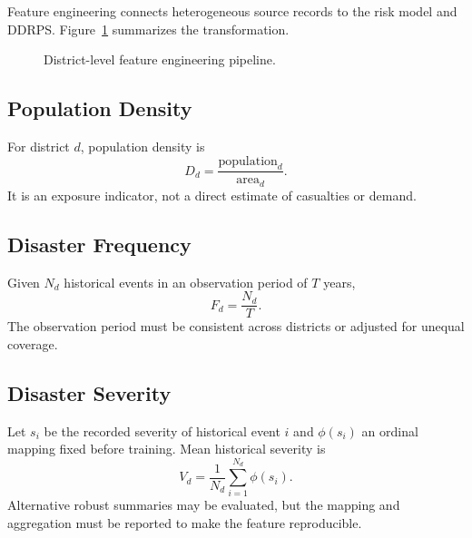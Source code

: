 \documentclass[conference]{IEEEtran}
\begin{document}
Feature engineering connects heterogeneous source records to the risk model and
DDRPS. Figure~\ref{fig:features} summarizes the transformation.

\begin{figure}[t]
\centering
{}
\caption{District-level feature engineering pipeline.}
\label{fig:features}
\end{figure}

\subsection{Population Density}
For district $d$, population density is
\begin{equation}
D_d=\frac{\text{population}_d}{\text{area}_d}.
\end{equation}
It is an exposure indicator, not a direct estimate of casualties or demand.

\subsection{Disaster Frequency}
Given $N_d$ historical events in an observation period of $T$ years,
\begin{equation}
F_d=\frac{N_d}{T}.
\end{equation}
The observation period must be consistent across districts or adjusted for
unequal coverage.

\subsection{Disaster Severity}
Let $s_i$ be the recorded severity of historical event $i$ and $\phi(s_i)$ an
ordinal mapping fixed before training. Mean historical severity is
\begin{equation}
V_d=\frac{1}{N_d}\sum_{i=1}^{N_d}\phi(s_i).
\end{equation}
Alternative robust summaries may be evaluated, but the mapping and aggregation
must be reported to make the feature reproducible.
\end{document}
